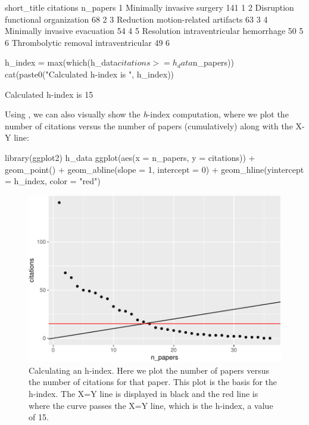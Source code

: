 \begin{Schunk}
\begin{Soutput}
                             short_title citations n_papers
1             Minimally invasive surgery       141        1
2     Disruption functional organization        68        2
3     Reduction motion-related artifacts        63        3
4          Minimally invasive evacuation        54        4
5 Resolution intraventricular hemorrhage        50        5
6  Thrombolytic removal intraventricular        49        6
\end{Soutput}
\begin{Sinput}
h_index = max(which(h_data$citations >= h_data$n_papers))
cat(paste0("Calculated h-index is ", h_index))
\end{Sinput}
\begin{Soutput}
Calculated h-index is 15
\end{Soutput}
\end{Schunk}

Using  \citep{ggplot2}, we can also visually show the
\emph{h}-index computation, where we plot the number of citations versus
the number of papers (cumulatively) along with the X-Y line:

\begin{Schunk}
\begin{Sinput}
library(ggplot2)
h_data %
  ggplot(aes(x = n_papers, y = citations)) + 
  geom_point() + geom_abline(slope = 1, intercept = 0) + 
  geom_hline(yintercept = h_index, color = "red")
\end{Sinput}
\begin{figure}
\includegraphics{muschelli_files/figure-latex/unnamed-chunk-13-1} \caption[Calculating an h-index]{Calculating an h-index.  Here we plot the number of papers versus the number of citations for that paper.  This plot is the basis for the h-index.  The X=Y line is displayed in black and the red line is where the curve passes the X=Y line, which is the h-index, a value of 15.}\label{fig:unnamed-chunk-13}
\end{figure}
\end{Schunk}

